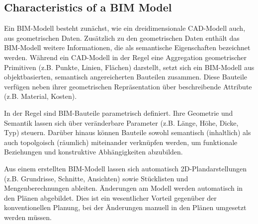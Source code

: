 \subsection{Characteristics of a BIM Model}
\begin{German}
    Ein BIM-Modell besteht zunächst, wie ein dreidimensionale CAD-Modell auch, aus geometrischen Daten. Zusätzlich zu den geometrischen Daten enthält das BIM-Modell weitere Informationen, die als semantische Eigenschaften bezeichnet werden. Während ein CAD-Modell in der Regel eine Aggregation geometrischer Primitiven (z.B. Punkte, Linien, Flächen) darstellt, setzt sich ein BIM-Modell aus objektbasierten, semantisch angereicherten Bauteilen zusammen. Diese Bauteile verfügen neben ihrer geometrischen Repräsentation über beschreibende Attribute (z.B. Material, Kosten). 
    
    In der Regel sind BIM-Bauteile parametrisch definiert. Ihre Geometrie und Semantik lassen sich über veränderbare Parameter (z.B. Länge, Höhe, Dicke, Typ) steuern. Darüber hinaus können Bauteile sowohl semantisch (inhaltlich) als auch topolgoisch (räumlich) miteinander verknüpfen werden, um funktionale Beziehungen und konstruktive Abhängigkeiten abzubilden.
    
    Aus einem erstellten BIM-Modell lassen sich automatisch 2D-Plandarstellungen (z.B. Grundrisse, Schnitte, Ansichten) sowie Stücklisten und Mengenberechnungen ableiten. Änderungen am Modell werden automatisch in den Plänen abgebildet. Dies ist ein wesentlicher Vorteil gegenüber der konventionellen Planung, bei der Änderungen manuell in den Plänen umgesetzt werden müssen. \cite{astourLehrbuchGrundlagenBIMArbeitsmethode2022} 
\end{German}


